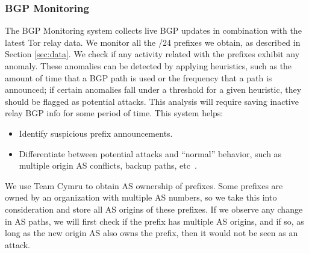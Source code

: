 
\subsubsection{BGP Monitoring} 
\label{sec:bgp}
The BGP Monitoring system collects live BGP updates in combination with the latest Tor relay data. We monitor all the /24 prefixes we obtain, as described in Section \ref{sec:data}. We check if any activity related with the prefixes exhibit any anomaly. These anomalies can be detected by applying heuristics, such as the amount of time that a BGP path is used or the frequency that a path is announced; if certain anomalies fall under a threshold for a given heuristic, they should be flagged as potential attacks. This analysis will require saving inactive relay BGP info for some period of time.  This system helps:

\begin{itemize}
\item Identify suspicious prefix announcements.
\item Differentiate between potential attacks and ``normal'' behavior, such as multiple origin AS conflicts, backup paths, etc~\cite{zhao2001analysis}.
\end{itemize}

We use Team Cymru \cite{teamcymru} to obtain AS ownership of prefixes. Some prefixes are owned by an organization with multiple AS numbers, so we take this into consideration and store all AS origins of these prefixes. If we observe any change in AS paths, we will first check if the prefix has multiple AS origins, and if so, as long as the new origin AS also owns the prefix, then it would not be seen as an attack. 

